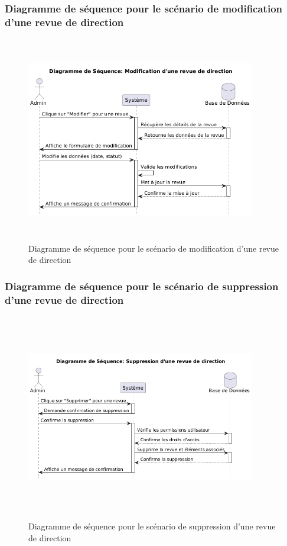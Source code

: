 \subsubsection{Diagramme de séquence pour le scénario de modification d'une revue de direction}
\begin{figure}[H]
    \centering
    \includegraphics[width=10cm,height=9cm]{images/modifyrevueseq.png}
    \caption{Diagramme de séquence pour le scénario de modification d'une revue de direction}
\end{figure}

\subsubsection{Diagramme de séquence pour le scénario de suppression d'une revue de direction}
\begin{figure}[H]
    \centering
    \includegraphics[width=10cm,height=9cm]{images/deleterevueseq.png}
    \caption{Diagramme de séquence pour le scénario de suppression d'une revue de direction}
\end{figure}

